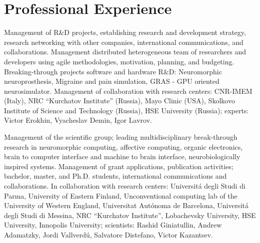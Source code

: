 \documentclass{moderncv}
\begin{document}
    \section{Professional Experience}

    {Management of R\&D projects, establishing research and development strategy, research networking with other companies, international communications, and collaborations. Management distributed heterogeneous team of researchers and developers using agile methodologies, motivation, planning, and budgeting. Breaking-through projects software and hardware R\&D: Neuromorphic neuroprosthesis, Migraine and pain simulation, GRAS - GPU oriented neurosimulator. Management of collaboration with research centers: CNR-IMEM (Italy), NRC “Kurchatov Institute” (Russia), Mayo Clinic (USA), Skolkovo Institute of Science and Technology (Russia), HSE University (Russia); experts: Victor Erokhin, Vyacheslav Demin, Igor Lavrov. }

    {Management of the scientific group; leading multidisciplinary break-through research in neuromorphic computing, affective computing, organic electronics, brain to computer interface and machine to brain interface, neurobiologically inspired systems. Management of grant applications, publication activities; bachelor, master, and Ph.D. students, international communications and collaborations. In collaboration with research centers: Universit\'{a} degli Studi di Parma, University of Eastern Finland, Unconventional computing lab of the University of Western England, Universitat Aut\'onoma de Barcelona, Universit\'{a} degli Studi di Messina, NRC “Kurchatov Institute”, Lobachevsky University, HSE University, Innopolis University; scientists: Rashid Giniatullin, Andrew Adamatzky, Jordi Vallverd\'{u}, Salvatore Distefano, Victor Kazantsev.}

\end{document}
